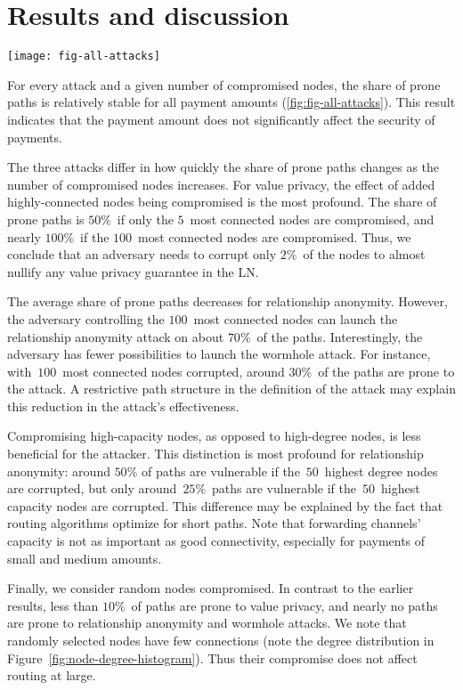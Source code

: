 \section{Results and discussion}

\begin{figure*}
	\centering
	\texttt{[image: fig-all-attacks]}
	\caption{Share of prone paths for each parameter combination.}
	\label{fig:fig-all-attacks}
\end{figure*}

For every attack and a given number of compromised nodes, the share of prone paths is relatively stable for all payment amounts (\cref{fig:fig-all-attacks}).
This result indicates that the payment amount does not significantly affect the security of payments.

The three attacks differ in how quickly the share of prone paths changes as the number of compromised nodes increases.
For value privacy, the effect of added highly-connected nodes being compromised is the most profound.
The share of prone paths is $50\%$~if only the $5$~most connected nodes are compromised, and nearly $100\%$~if the $100$~most connected nodes are compromised.
Thus, we conclude that an adversary needs to corrupt only $2\%$~of the nodes to almost nullify any value privacy guarantee in the LN\@.

The average share of prone paths decreases for relationship anonymity.
However, the adversary controlling the $100$~most connected nodes can launch the relationship anonymity attack on about $70\%$~of the paths.
Interestingly, the adversary has fewer possibilities to launch the wormhole attack.
For instance, with~$100$~most connected nodes corrupted, around $30\%$~of the paths are prone to the attack.
A restrictive path structure in the definition of the attack may explain this reduction in the attack's effectiveness.

Compromising high-capacity nodes, as opposed to high-degree nodes, is less beneficial for the attacker.
This distinction is most profound for relationship anonymity: around $50\%$ of paths are vulnerable if the~$50$~highest degree nodes are corrupted, but only around~$25\%$~paths are vulnerable if the~$50$~highest capacity nodes are corrupted.
This difference may be explained by the fact that routing algorithms optimize for short paths.
Note that forwarding channels' capacity is not as important as good connectivity, especially for payments of small and medium amounts.

Finally, we consider random nodes compromised.
In contrast to the earlier results, less than $10\%$~of paths are prone to value privacy, and nearly no paths are prone to relationship anonymity and wormhole attacks.
We note that randomly selected nodes have few connections (note the degree distribution in Figure~\ref{fig:node-degree-histogram}).
Thus their compromise does not affect routing at large.

